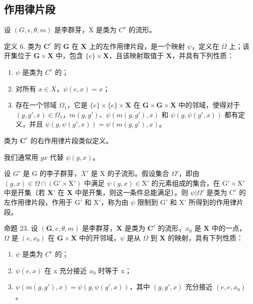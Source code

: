 \subsection{作用律片段}

设 \((G, e, \theta, m)\) 是李群芽，X 是类为 \(C^r\) 的流形。

定义 6. 类为 \(\mathbf{C}^r\) 的 \(\mathbf{G}\) 在 \(\mathbf{X}\) 上的左作用律片段，是一个映射 \(\psi\)，定义在 \(\Omega\) 上；该开集位于 \(\mathbf{G} \times \mathbf{X}\) 中，包含 \(\{e\} \times \mathbf{X}\)，且该映射取值于 \(\mathbf{X}\)，并具有下列性质：

\begin{enumerate}
\def\labelenumi{(\roman{enumi})}
\item
  \(\psi\) 是类为 \(C^{r}\) 的；
\item
  对所有 \(x \in X\)，\(\psi(e, x) = x\)；
\item
  存在一个邻域 \(\Omega_1\)，它是 \(\{e\} \times \{e\} \times \mathbf{X}\) 在 \(\mathbf{G} \times \mathbf{G} \times \mathbf{X}\) 中的邻域，使得对于 \((g, g', x) \in \Omega_1\)，\(m(g, g')\)、\(\psi(m(g, g'), x)\) 和 \(\psi(g, \psi(g', x))\) 都有定义，并且 \(\psi(g, \psi(g', x)) = \psi(m(g, g'), x)\)。
\end{enumerate}

类为 \(\mathbf{C}^r\) 的右作用律片段类似定义。

我们通常用 \(gx\) 代替 \(\psi(g, x)\)。

设 \(G'\) 是 G 的李子群芽，\(X'\) 是 X 的子流形。假设集合 \(\Omega'\)，即由 \((g,x)\in \Omega \cap (\mathrm{G}'\times \mathrm{X}')\) 中满足 \(\psi (g,x)\in \mathrm{X}'\) 的元素组成的集合，在 \(\mathrm{G}'\times \mathrm{X}'\) 中是开集（若 \(\mathbf{X}'\) 在 \(\mathbf{X}\) 中是开集，则这一条件总能满足）。则 \(\psi |\Omega '\) 是类为 \(\mathrm{C}^r\) 的左作用律片段，作用于 \(\mathrm{G}'\) 和 \(\mathrm{X}'\)，称为由 \(\psi\) 限制到 \(\mathrm{G}'\) 和 \(\mathrm{X}'\) 所得到的作用律片段。

命题 23. 设 \((\mathbf{G}, e, \theta, m)\) 是李群芽，\(\mathbf{X}\) 是类为 \(\mathbf{C}^r\) 的流形，\(x_0\) 是 \(\mathbf{X}\) 中的一点，\(\Omega\) 是 \((e, x_0)\) 在 \(\mathbf{G} \times \mathbf{X}\) 中的开邻域，\(\psi\) 是从 \(\Omega\) 到 \(\mathbf{X}\) 的映射，具有下列性质：

\begin{enumerate}
\def\labelenumi{(\roman{enumi})}
\item
  \(\psi\) 是类为 \(C^{r}\) 的；
\item
  \(\psi(e, x)\) 在 x 充分接近 \(x_{0}\) 时等于 x；
\item
  \(\psi(m(g, g'), x) = \psi(g, \psi(g', x))\)，其中 \((g, g', x)\) 充分接近 \((e, e, x_0)\)。
\end{enumerate}

